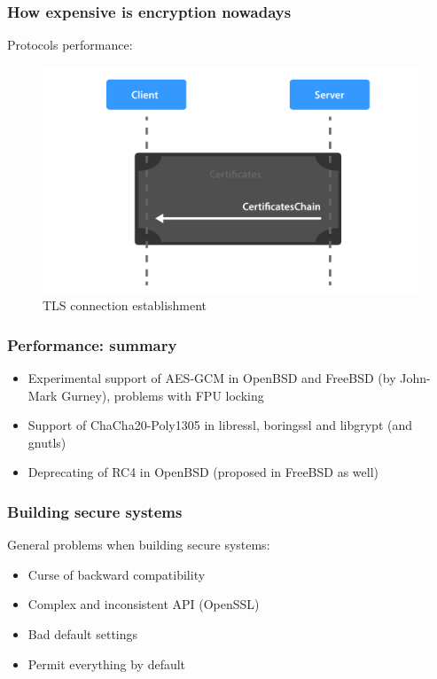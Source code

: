\documentclass[12pt,t]{beamer}
\newcommand{\cipher}[1]{
	{\color{blue!30} #1}
}
\begin{document}
\begin{frame}[fragile]
\frametitle{How expensive is encryption nowadays}
Protocols performance:
\begin{figure}[H]
\centering
\includegraphics[height=0.6\textheight]{tls.pdf}
\caption{TLS connection establishment}
\end{figure}
\end{frame}

\begin{frame}
\frametitle{Performance: summary}
\begin{itemize}
\item<1-> Experimental support of \cipher{AES-GCM} in OpenBSD and FreeBSD (by John-Mark 
Gurney), 
problems with FPU locking
\item<2-> Support of \cipher{ChaCha20-Poly1305} in libressl, boringssl and libgrypt (and 
gnutls)
\item<3-> Deprecating of \cipher{RC4} in OpenBSD (proposed in FreeBSD as well)
\end{itemize}
\end{frame}

\begin{frame}
\frametitle{Building secure systems}
General problems when building secure systems:
\begin{itemize}
\item<1-> Curse of backward compatibility
\item<2-> Complex and inconsistent API (OpenSSL)
\item<3-> Bad default settings
\item<3-> Permit everything by default
\end{itemize}
\end{frame}
\end{document}
